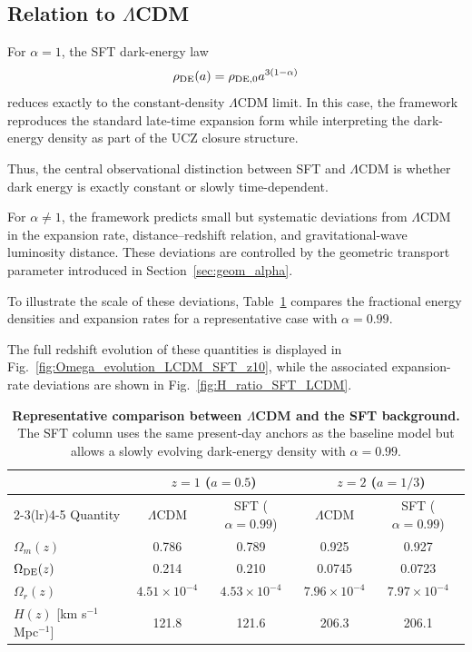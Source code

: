 \documentclass[12pt]{article}
\begin{document}
\subsection{Relation to $\Lambda$CDM}

For $\alpha=1$, the SFT dark-energy law
\[
\rho_{\rm DE}(a)=\rho_{{\rm DE},0}a^{3(1-\alpha)}
\]
reduces exactly to the constant-density $\Lambda$CDM limit. In this case, the
framework reproduces the standard late-time expansion form while interpreting
the dark-energy density as part of the UCZ closure structure.

Thus, the central observational distinction between SFT and $\Lambda$CDM is
whether dark energy is exactly constant or slowly time-dependent.

For $\alpha\neq1$, the framework predicts small but systematic deviations from
$\Lambda$CDM in the expansion rate, distance--redshift relation, and
gravitational-wave luminosity distance. These deviations are controlled by the
geometric transport parameter introduced in Section~\ref{sec:geom_alpha}.

To illustrate the scale of these deviations, Table~\ref{tab:LCDM_vs_SFT_z}
compares the fractional energy densities and expansion rates for a representative
case with $\alpha=0.99$.

The full redshift evolution of these quantities is displayed in
Fig.~\ref{fig:Omega_evolution_LCDM_SFT_z10}, while the associated
expansion-rate deviations are shown in
Fig.~\ref{fig:H_ratio_SFT_LCDM}.

\begin{table}[h!]
\centering
\footnotesize
\setlength{\tabcolsep}{6pt}
\renewcommand{\arraystretch}{1.15}
\caption{\textbf{Representative comparison between $\Lambda$CDM and the SFT background.}
The SFT column uses the same present-day anchors as the baseline model but allows
a slowly evolving dark-energy density with $\alpha=0.99$.}
\label{tab:LCDM_vs_SFT_z}
\begin{tabular}{lcccc}
\toprule
 & \multicolumn{2}{c}{$z=1$ ($a=0.5$)} 
 & \multicolumn{2}{c}{$z=2$ ($a=1/3$)} \\
\cmidrule(lr){2-3}\cmidrule(lr){4-5}
Quantity 
& $\Lambda$CDM 
& SFT ($\alpha=0.99$) 
& $\Lambda$CDM 
& SFT ($\alpha=0.99$) \\
\midrule
$\Omega_m(z)$        
& 0.786 & 0.789 & 0.925 & 0.927 \\
$\Omega_{\rm DE}(z)$ 
& 0.214 & 0.210 & 0.0745 & 0.0723 \\
$\Omega_r(z)$        
& $4.51\times10^{-4}$ & $4.53\times10^{-4}$ 
& $7.96\times10^{-4}$ & $7.97\times10^{-4}$ \\
$H(z)$ [km s$^{-1}$ Mpc$^{-1}$] 
& 121.8 & 121.6 & 206.3 & 206.1 \\
\bottomrule
\end{tabular}
\end{table}
\end{document}
